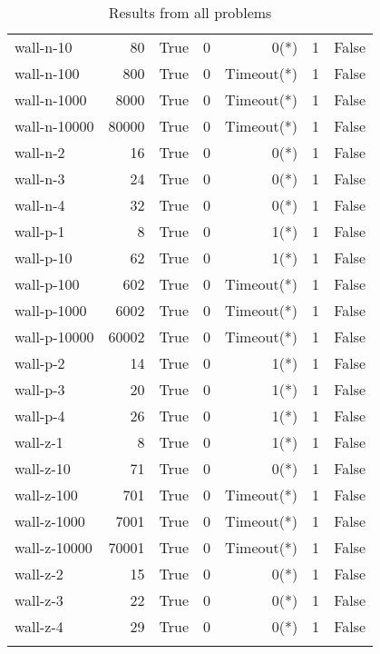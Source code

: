 \begin{longtable}{lrlrrrl}
wall-n-10 & 80 & True & 0 & 0(*) & 1 & False \\
wall-n-100 & 800 & True & 0 & Timeout(*) & 1 & False \\
wall-n-1000 & 8000 & True & 0 & Timeout(*) & 1 & False \\
wall-n-10000 & 80000 & True & 0 & Timeout(*) & 1 & False \\
wall-n-2 & 16 & True & 0 & 0(*) & 1 & False \\
wall-n-3 & 24 & True & 0 & 0(*) & 1 & False \\
wall-n-4 & 32 & True & 0 & 0(*) & 1 & False \\
wall-p-1 & 8 & True & 0 & 1(*) & 1 & False \\
wall-p-10 & 62 & True & 0 & 1(*) & 1 & False \\
wall-p-100 & 602 & True & 0 & Timeout(*) & 1 & False \\
wall-p-1000 & 6002 & True & 0 & Timeout(*) & 1 & False \\
wall-p-10000 & 60002 & True & 0 & Timeout(*) & 1 & False \\
wall-p-2 & 14 & True & 0 & 1(*) & 1 & False \\
wall-p-3 & 20 & True & 0 & 1(*) & 1 & False \\
wall-p-4 & 26 & True & 0 & 1(*) & 1 & False \\
wall-z-1 & 8 & True & 0 & 1(*) & 1 & False \\
wall-z-10 & 71 & True & 0 & 0(*) & 1 & False \\
wall-z-100 & 701 & True & 0 & Timeout(*) & 1 & False \\
wall-z-1000 & 7001 & True & 0 & Timeout(*) & 1 & False \\
wall-z-10000 & 70001 & True & 0 & Timeout(*) & 1 & False \\
wall-z-2 & 15 & True & 0 & 0(*) & 1 & False \\
wall-z-3 & 22 & True & 0 & 0(*) & 1 & False \\
wall-z-4 & 29 & True & 0 & 0(*) & 1 & False \\
\caption{Results from all problems}\label{table:results}
\end{longtable}